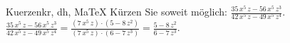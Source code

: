 \begin{MAufgabe}{Kuerzen}{kr, dh, MaTeX}
K\"urzen Sie soweit m\"oglich: $\frac{35\, x^5\, z - 56\, x^5\, z^3}{42\, x^5\, z - 49\, x^5\, z^4}$.\\ 
\ifLsg\MLoesung
\quad $\frac{35\, x^5\, z - 56\, x^5\, z^3}{42\, x^5\, z - 49\, x^5\, z^4}=\frac{(7\, x^5\, z)\cdot(5 - 8\, z^2)}{(7\, x^5\, z)\cdot(6 - 7\, z^3)}=\frac{5 - 8\, z^2}{6 - 7\, z^3}$.\else\relax\fi
 \end{MAufgabe}